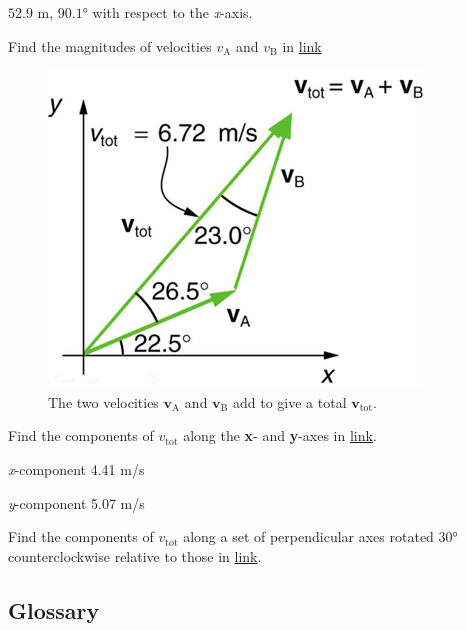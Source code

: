 \documentclass[
]{book}
\newenvironment{problems-exercises}{}{}
\begin{document}
\begin{problems-exercises}
\leavevmode\hypertarget{fs-id1165298695430}{}%
\({\text{52}\text{.}\text{9\ m}}{}\), \({\text{90}\text{.}\text{1°}}{}\)
with respect to the \emph{x}-axis.

\hypertarget{fs-id1165298704732}{}
\leavevmode\hypertarget{fs-id1165298994968}{}%
Find the magnitudes of velocities \(v_{\text{A}}{}\) and \(v_{\text{B}}{}\)
in \protect\hyperlink{import-auto-id1165296217666}{link}

\begin{figure}
\hypertarget{import-auto-id1165296217666}{%
\centering
\includegraphics{images/Figure_03_02_23a.jpg}
\caption{The two velocities \(\textbf{v}_{\text{A}}{}\) and
\(\textbf{v}_{\text{B}}{}\) add to give a total
\(\textbf{v}_{\text{tot}}{}\).}\label{import-auto-id1165296217666}
}
\end{figure}

\hypertarget{fs-id1165298735190}{}
\leavevmode\hypertarget{fs-id1165296330739}{}%
Find the components of \(v_{\text{tot}}{}\) along the \textbf{x}- and
\textbf{y}-axes in
\protect\hyperlink{import-auto-id1165296217666}{link}.

\leavevmode\hypertarget{fs-id1165298808711}{}%
\emph{x}-component 4.41 m/s

\emph{y}-component 5.07 m/s

\hypertarget{fs-id1165296227129}{}
\leavevmode\hypertarget{fs-id1165296227130}{}%
Find the components of \(v_{\text{tot}}{}\) along a set of perpendicular
axes rotated \(\text{30°}{}\) counterclockwise relative to those in
\protect\hyperlink{import-auto-id1165296217666}{link}.

\end{problems-exercises}

\hypertarget{glossary-7}{%
\subsection{Glossary}\label{glossary-7}}
\end{document}
